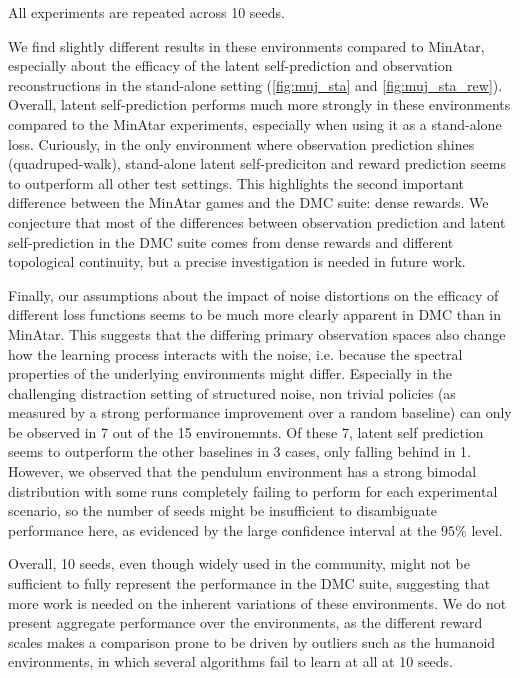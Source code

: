 All experiments are repeated across 10 seeds.

We find slightly different results in these environments compared to MinAtar, especially about the efficacy of the latent self-prediction and observation reconstructions in the stand-alone setting (\autoref{fig:muj_sta} and \autoref{fig:muj_sta_rew}). Overall, latent self-prediction performs much more strongly in these environments compared to the MinAtar experiments, especially when using it as a stand-alone loss.
Curiously, in the only environment where observation prediction shines (quadruped-walk), stand-alone latent self-prediciton and reward prediction seems to outperform all other test settings.
This highlights the second important difference between the MinAtar games and the DMC suite: dense rewards.
We conjecture that most of the differences between observation prediction and latent self-prediction in the DMC suite comes from dense rewards and different topological continuity, but a precise investigation is needed in future work.

Finally, our assumptions about the impact of noise distortions on the efficacy of different loss functions seems to be much more clearly apparent in DMC than in MinAtar. This suggests that the differing primary observation spaces also change how the learning process interacts with the noise, i.e. because the spectral properties of the underlying environments might differ.
Especially in the challenging distraction setting of structured noise, non trivial policies (as measured by a strong performance improvement over a random baseline) can only be observed in 7 out of the 15 environemnts. Of these 7, latent self prediction seems to outperform the other baselines in 3 cases, only falling behind in 1. However, we observed that the pendulum environment has a strong bimodal distribution with some runs completely failing to perform for each experimental scenario, so the number of seeds might be insufficient to disambiguate performance here, as evidenced by the large confidence interval at the $95\%$ level.

Overall, 10 seeds, even though widely used in the community, might not be sufficient to fully represent the performance in the DMC suite, suggesting that more work is needed on the inherent variations of these environments.
We do not present aggregate performance over the environments, as the different reward scales makes a comparison prone to be driven by outliers such as the humanoid environments, in which several algorithms fail to learn at all at 10 seeds.

